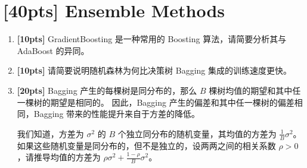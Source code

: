 \documentclass[a4paper,UTF8]{article}
\theoremstyle{definition}
\begin{document}
\section{[40pts] Ensemble Methods}
\begin{enumerate}[(1)]
	\item \textbf{[10pts]} GradientBoosting\cite{friedman2001greedy} 是一种常用的 Boosting 算法，请简要分析其与 AdaBoost 的异同。
	\item \textbf{[10pts]} 请简要说明随机森林为何比决策树 Bagging 集成的训练速度更快。
	\item \textbf{[20pts]} Bagging 产生的每棵树是同分布的，那么 $B$ 棵树均值的期望和其中任一棵树的期望是相同的。
	      因此，Bagging 产生的偏差和其中任一棵树的偏差相同，Bagging 带来的性能提升来自于方差的降低。

	      我们知道，方差为 $\sigma^2$ 的 $B$ 个独立同分布的随机变量，其均值的方差为 $\frac{1}{B}\sigma^2$。如果这些随机变量是同分布的，但不是独立的，设两两之间的相关系数 $\rho>0$，请推导均值的方差为 $\rho \sigma^{2}+\frac{1-\rho}{B} \sigma^{2}$。
\end{enumerate}
\end{document}
